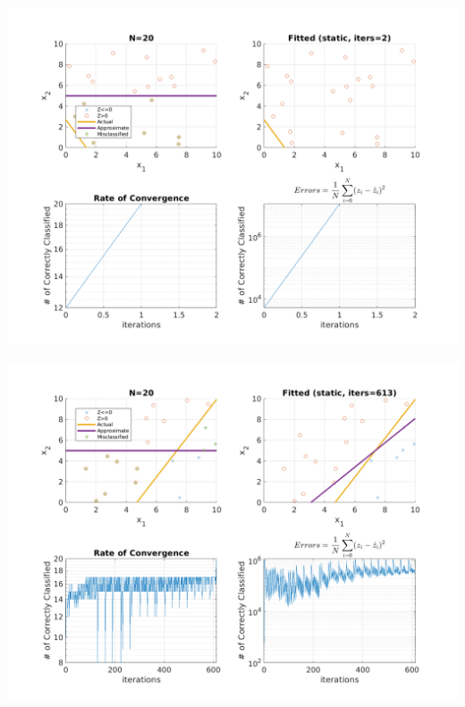 \documentclass{article}
\newenvironment{Figure}
  {\par\medskip\noindent\minipage{\linewidth}}
  {\endminipage\par\medskip}
\begin{document}
\begin{multicols}{2}
\begin{Figure}
\end{Figure}
\begin{Figure}
\centering
\includegraphics[width=\linewidth]{pngs/n20_static4.png}
\end{Figure}
\begin{Figure}
\centering
\includegraphics[width=\linewidth]{pngs/n20_static5.png}
\end{Figure}


\end{multicols}
\end{document}
